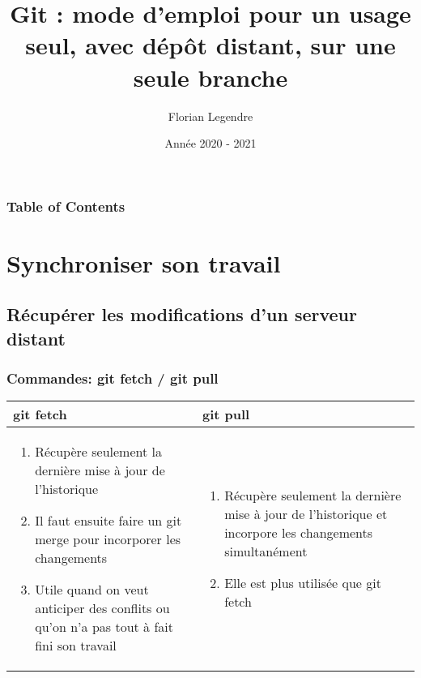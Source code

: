 \documentclass{beamer}
\title[Git seul connecté mono-branche]{Git : mode d'emploi pour un usage seul, avec dépôt distant, sur une seule branche}
\author{Florian Legendre}
\institute{Université de Poitiers}
\date{Année 2020 - 2021}
\begin{document}
\frame{\titlepage}

\begin{frame}
\frametitle{Table of Contents}
\tableofcontents[hideallsubsections]
\end{frame}


\section{Synchroniser son travail}

\subsection{Récupérer les modifications d'un serveur distant}
\begin{frame}
\frametitle{Commandes: git fetch / git pull}

\begin{tabular}{ | m{13em} | m{13em} | }
    \hline
    
    \textbf{git fetch} & \textbf{git pull}\\
        
    \hline
    
    \begin{enumerate}
        \item Récupère seulement la dernière mise à jour de l'historique
        \item Il faut ensuite faire un git merge pour incorporer les changements
        \item Utile quand on veut anticiper des conflits ou qu'on n'a pas tout à fait fini son travail
    \end{enumerate}
    & 
    
    \begin{enumerate}
    \item Récupère seulement la dernière mise à jour de l'historique et incorpore les changements simultanément
    \item Elle est plus utilisée que git fetch
    \end{enumerate} \\
    
    \hline
\end{tabular}

\end{frame}
\end{document}

